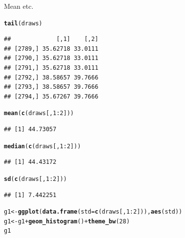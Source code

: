 \documentclass{article}\usepackage[]{graphicx}\usepackage[]{color}
\makeatletter
\newcommand{\hlnum}[1]{\textcolor[rgb]{0.686,0.059,0.569}{#1}}%
\newcommand{\hlopt}[1]{\textcolor[rgb]{0,0,0}{#1}}%
\newcommand{\hlstd}[1]{\textcolor[rgb]{0.345,0.345,0.345}{#1}}%
\newcommand{\hlkwb}[1]{\textcolor[rgb]{0.69,0.353,0.396}{#1}}%
\newcommand{\hlkwc}[1]{\textcolor[rgb]{0.333,0.667,0.333}{#1}}%
\newcommand{\hlkwd}[1]{\textcolor[rgb]{0.737,0.353,0.396}{\textbf{#1}}}%
\newenvironment{kframe}{%
 \def\at@end@of@kframe{}%
 \ifinner\ifhmode%
  \def\at@end@of@kframe{\end{minipage}}%
  \begin{minipage}{\columnwidth}%
 \fi\fi%
 \def\FrameCommand##1{\hskip\@totalleftmargin \hskip-\fboxsep
 \colorbox{shadecolor}{##1}\hskip-\fboxsep
     \hskip-\linewidth \hskip-\@totalleftmargin \hskip\columnwidth}%
 \MakeFramed {\advance\hsize-\width
   \@totalleftmargin\z@ \linewidth\hsize
   \@setminipage}}%
 {\par\unskip\endMakeFramed%
 \at@end@of@kframe}
\newenvironment{knitrout}{}{} %
\makeatother
\begin{document}
Mean etc.

\begin{knitrout}
\color{fgcolor}\begin{kframe}
\begin{alltt}
\hlkwd{tail}\hlstd{(draws)}
\end{alltt}
\begin{verbatim}
##             [,1]    [,2]
## [2789,] 35.62718 33.0111
## [2790,] 35.62718 33.0111
## [2791,] 35.62718 33.0111
## [2792,] 38.58657 39.7666
## [2793,] 38.58657 39.7666
## [2794,] 35.67267 39.7666
\end{verbatim}
\begin{alltt}
\hlkwd{mean}\hlstd{(}\hlkwd{c}\hlstd{(draws[,} \hlnum{1}\hlopt{:}\hlnum{2}\hlstd{]))}
\end{alltt}
\begin{verbatim}
## [1] 44.73057
\end{verbatim}
\begin{alltt}
\hlkwd{median}\hlstd{(}\hlkwd{c}\hlstd{(draws[,} \hlnum{1}\hlopt{:}\hlnum{2}\hlstd{]))}
\end{alltt}
\begin{verbatim}
## [1] 44.43172
\end{verbatim}
\begin{alltt}
\hlkwd{sd}\hlstd{(}\hlkwd{c}\hlstd{(draws[,} \hlnum{1}\hlopt{:}\hlnum{2}\hlstd{]))}
\end{alltt}
\begin{verbatim}
## [1] 7.442251
\end{verbatim}
\begin{alltt}
\hlstd{g1} \hlkwb{<-} \hlkwd{ggplot}\hlstd{(}\hlkwd{data.frame}\hlstd{(}\hlkwc{std} \hlstd{=} \hlkwd{c}\hlstd{(draws[,} \hlnum{1}\hlopt{:}\hlnum{2}\hlstd{])),} \hlkwd{aes}\hlstd{(std))}
\hlstd{g1} \hlkwb{<-} \hlstd{g1} \hlopt{+} \hlkwd{geom_histogram}\hlstd{()} \hlopt{+} \hlkwd{theme_bw}\hlstd{(}\hlnum{28}\hlstd{)}
\hlstd{g1}
\end{alltt}



\end{kframe}
\end{knitrout}
\end{document}

